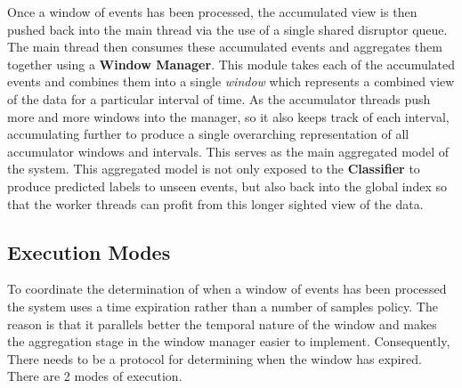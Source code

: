 \documentclass[a4paper,11pt]{scrreprt}
\begin{document}
Once a window of events has been processed, the accumulated view is then pushed back into the main thread via the use of a single shared disruptor queue. The main thread then consumes these accumulated events and aggregates them together using a \textbf{Window Manager}. This module takes each of the accumulated events and combines them into a single \textit{window} which represents a combined view of the data for a particular interval of time. As the accumulator threads push more and more windows into the manager, so it also keeps track of each interval, accumulating further to produce a single overarching representation of all accumulator windows and intervals. This serves as the main aggregated model of the system. This aggregated model is not only exposed to the \textbf{Classifier} to produce predicted labels to unseen events, but also back into the global index so that the worker threads can profit from this longer sighted view of the data.

\subsection{Execution Modes}
To coordinate the determination of when a window of events has been processed the system uses a time expiration rather than a number of samples policy. The reason is that it parallels better the temporal nature of the window and makes the aggregation stage in the window manager easier to implement. Consequently, There needs to be a protocol for determining when the window has expired. There are 2 modes of execution. 
\end{document}
